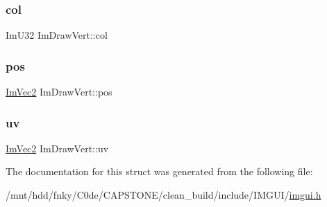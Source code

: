 \subsubsection{\texorpdfstring{col}{col}}
{\footnotesize\ttfamily Im\+U32 Im\+Draw\+Vert\+::col}

\mbox{\label{structImDrawVert_aedc578bbf364ddea71be12b4f177a5b4}} 
\subsubsection{\texorpdfstring{pos}{pos}}
{\footnotesize\ttfamily \hyperlink{structImVec2}{Im\+Vec2} Im\+Draw\+Vert\+::pos}

\mbox{\label{structImDrawVert_abdf3183529055a6c3f709b23a4bf06b1}} 
\subsubsection{\texorpdfstring{uv}{uv}}
{\footnotesize\ttfamily \hyperlink{structImVec2}{Im\+Vec2} Im\+Draw\+Vert\+::uv}



The documentation for this struct was generated from the following file\+:\begin{DoxyCompactItemize}
\item 
/mnt/hdd/fnky/\+C0de/\+C\+A\+P\+S\+T\+O\+N\+E/clean\+\_\+build/include/\+I\+M\+G\+U\+I/\hyperlink{imgui_8h}{imgui.\+h}\end{DoxyCompactItemize}
